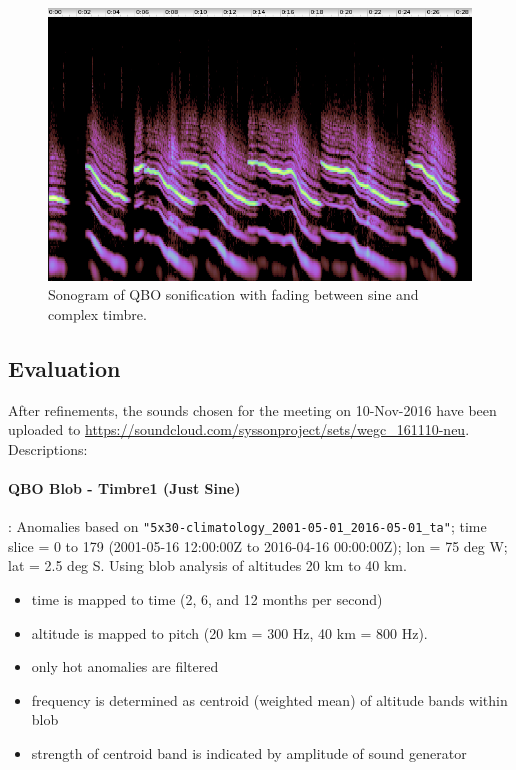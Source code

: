 \documentclass[11pt,a4paper]{article}
\begin{document}
\begin{figure}
\centering
\includegraphics[width=\textwidth]{figures/blob-shaper-timbre4-161107.png}
\caption{Sonogram of QBO sonification with fading between sine and complex timbre.}
\label{fig:sono-shaper-timbre4}
\end{figure}

\subsection{Evaluation}

After refinements, the sounds chosen for the meeting on 10-Nov-2016 have been uploaded to \url{https://soundcloud.com/syssonproject/sets/wegc_161110-neu}. Descriptions:

\paragraph{QBO Blob - Timbre1 (Just Sine)}:
Anomalies based on \Verb!"5x30-climatology_2001-05-01_2016-05-01_ta"!; time slice = 0 to 179 (2001-05-16 12:00:00Z to 2016-04-16 00:00:00Z); lon = 75 deg W; lat = 2.5 deg S. Using blob analysis of altitudes 20 km to 40 km.
%
\begin{itemize}
\item time is mapped to time (2, 6, and 12 months per second)
\item altitude is mapped to pitch (20 km = 300 Hz, 40 km = 800 Hz).
\item only hot anomalies are filtered
\item frequency is determined as centroid (weighted mean) of altitude bands within blob
\item strength of centroid band is indicated by amplitude of sound generator
\end{itemize}
\end{document}
